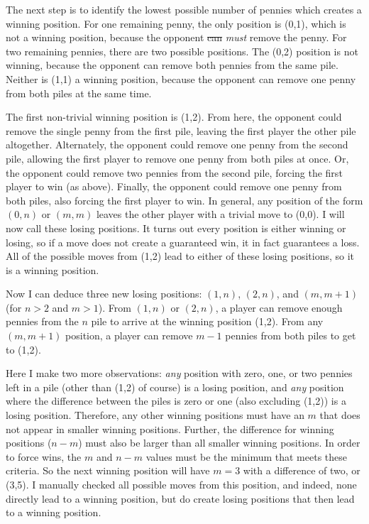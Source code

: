 \documentclass{article}
\begin{document}
The next step is to identify the lowest possible number of pennies which creates a winning position.
For one remaining penny, the only position is (0,1), which is not a winning position, because the opponent \sout{can} \textit{must} remove the penny.
For two remaining pennies, there are two possible positions.
The (0,2) position is not winning, because the opponent can remove both pennies from the same pile.
Neither is (1,1) a winning position, because the opponent can remove one penny from both piles at the same time.

The first non-trivial winning position is (1,2).
From here, the opponent could remove the single penny from the first pile, leaving the first player the other pile altogether.
Alternately, the opponent could remove one penny from the second pile, allowing the first player to remove one penny from both piles at once.
Or, the opponent could remove two pennies from the second pile, forcing the first player to win (as above).
Finally, the opponent could remove one penny from both piles, also forcing the first player to win.
In general, any position of the form $(0,n)$ or $(m,m)$ leaves the other player with a trivial move to (0,0).
I will now call these losing positions.
It turns out every position is either winning or losing, so if a move does not create a guaranteed win, it in fact guarantees a loss.
All of the possible moves from (1,2) lead to either of these losing positions, so it is a winning position.

Now I can deduce three new losing positions: $(1,n)$, $(2,n)$, and $(m,m+1)$ (for $n>2$ and $m>1$).
From $(1,n)$ or $(2,n)$, a player can remove enough pennies from the $n$ pile to arrive at the winning position (1,2).
From any $(m,m+1)$ position, a player can remove $m-1$ pennies from both piles to get to (1,2).

Here I make two more observations: \textit{any} position with zero, one, or two pennies left in a pile (other than (1,2) of course) is a losing position, and \textit{any} position where the difference between the piles is zero or one (also excluding (1,2)) is a losing position.
Therefore, any other winning positions must have an $m$ that does not appear in smaller winning positions.
Further, the difference for winning positions ($n-m$) must also be larger than all smaller winning positions.
In order to force wins, the $m$ and $n-m$ values must be the minimum that meets these criteria.
So the next winning position will have $m=3$ with a difference of two, or (3,5).
I manually checked all possible moves from this position, and indeed, none directly lead to a winning position, but do create losing positions that then lead to a winning position.
\end{document}
